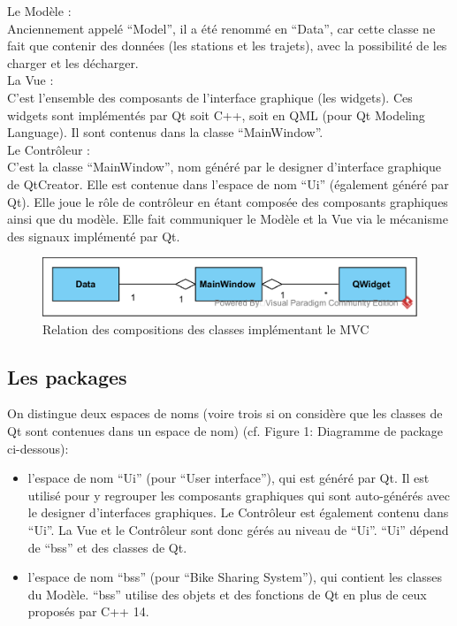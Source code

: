 \documentclass[12pt]{article}
\begin{document}
		Le Modèle :\\
		Anciennement appelé “Model”, il a été renommé en “Data”, car cette classe ne fait
		que contenir des données (les stations et les trajets), avec la possibilité de les
		charger et les décharger.\\
		
		La Vue :\\
		C’est l’ensemble des composants de l’interface graphique (les widgets). Ces
		widgets sont implémentés par Qt soit C++, soit en QML (pour Qt Modeling Language).
		Il sont contenus dans la classe “MainWindow”.\\
				
		Le Contrôleur :\\
		C’est la classe “MainWindow”, nom généré par le designer d’interface graphique
		de QtCreator. Elle est contenue dans l’espace de nom “Ui” (également généré par Qt).
		Elle joue le rôle de contrôleur en étant composée des composants graphiques ainsi
		que du modèle. Elle fait communiquer le Modèle et la Vue via le mécanisme
		des signaux implémenté par Qt. \\
		
		\begin{figure}[!h]
		\begin{center}
		\includegraphics[scale=1]{dia_class_mvc.png}
		\caption{Relation des compositions des classes implémentant le MVC}
		\end{center}
		\end{figure}
		
		\subsection{Les packages}
		On distingue deux espaces de noms (voire trois si on considère que les classes de
		Qt sont contenues dans un espace de nom) (cf. Figure 1: Diagramme de package
		ci-dessous):\\
	
		\begin{itemize}
		\item l’espace de nom “Ui” (pour “User interface”), qui est généré par Qt. Il est utilisé
		pour y regrouper les composants graphiques qui sont auto-générés avec le designer
		d’interfaces graphiques. Le Contrôleur est également contenu dans “Ui”. La Vue et
		le Contrôleur sont donc gérés au niveau de “Ui”. “Ui” dépend de “bss” et des
		classes de Qt.\\
		
		\item l’espace de nom “bss” (pour “Bike Sharing System”), qui contient les
		classes du Modèle. “bss” utilise des objets et des fonctions de Qt en plus de
		ceux proposés par C++ 14.
		\end{itemize}
\end{document}
